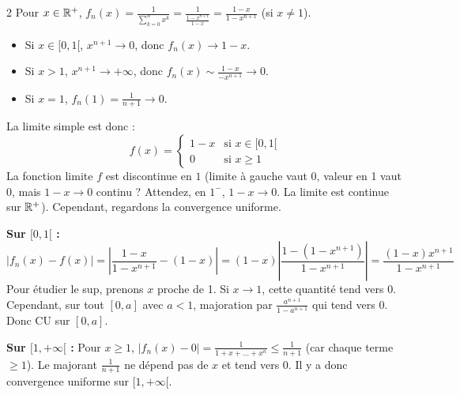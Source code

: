 \documentclass{prepacours}
\begin{document}
\begin{correction}{2}
Pour $x \in \mathbb{R}^+$, $f_n(x) = \frac{1}{\sum_{k=0}^n x^k} = \frac{1}{\frac{1-x^{n+1}}{1-x}} = \frac{1-x}{1-x^{n+1}}$ (si $x \neq 1$).
\begin{itemize}
    \item Si $x \in [0, 1[$, $x^{n+1} \to 0$, donc $f_n(x) \to 1-x$.
    \item Si $x > 1$, $x^{n+1} \to +\infty$, donc $f_n(x) \sim \frac{1-x}{-x^{n+1}} \to 0$.
    \item Si $x = 1$, $f_n(1) = \frac{1}{n+1} \to 0$.
\end{itemize}
La limite simple est donc :
$$ f(x) = \begin{cases} 1-x & \text{si } x \in [0, 1[ \\ 0 & \text{si } x \ge 1 \end{cases} $$
La fonction limite $f$ est discontinue en $1$ (limite à gauche vaut 0, valeur en 1 vaut 0, mais $1-x \to 0$ continu ? Attendez, en $1^-$, $1-x \to 0$. La limite est continue sur $\mathbb{R}^+$).
Cependant, regardons la convergence uniforme.

\textbf{Sur $[0, 1[$ :}
$$ |f_n(x) - f(x)| = \left| \frac{1-x}{1-x^{n+1}} - (1-x) \right| = (1-x) \left| \frac{1 - (1-x^{n+1})}{1-x^{n+1}} \right| = \frac{(1-x)x^{n+1}}{1-x^{n+1}} $$
Pour étudier le sup, prenons $x$ proche de 1. Si $x \to 1$, cette quantité tend vers $0$.
Cependant, sur tout $[0, a]$ avec $a < 1$, majoration par $\frac{a^{n+1}}{1-a^{n+1}}$ qui tend vers 0. Donc CU sur $[0, a]$.

\textbf{Sur $[1, +\infty[$ :}
Pour $x \ge 1$, $|f_n(x) - 0| = \frac{1}{1+x+\dots+x^n} \le \frac{1}{n+1}$ (car chaque terme $\ge 1$).
Le majorant $\frac{1}{n+1}$ ne dépend pas de $x$ et tend vers 0.
Il y a donc convergence uniforme sur $[1, +\infty[$.
\end{correction}
\end{document}
